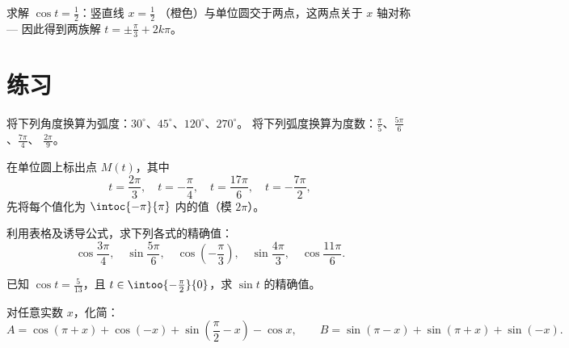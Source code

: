 \begin{omfigure}

{\small 求解 $\cos t = \frac12$：竖直线 $x = \frac12$
（橙色）与单位圆交于两点，这两点关于 $x$ 轴对称
--- 因此得到两族解 $t = \pm\frac\pi3 + 2k\pi$。}
\end{omfigure}

\section{练习}

\begin{exercise}[$\star$]\label{exo:g11:trigo:1}
将下列角度换算为弧度：$30^\circ$、$45^\circ$、$120^\circ$、$270^\circ$。
将下列弧度换算为度数：$\frac{\pi}{5}$、$\frac{5\pi}{6}$、$\frac{7\pi}{4}$、
$\frac{2\pi}{9}$。
\end{exercise}

\begin{exercise}[$\star$]\label{exo:g11:trigo:2}
在单位圆上标出点 $M(t)$，其中
\[
t = \frac{2\pi}{3},\quad
t = -\frac{\pi}{4},\quad
t = \frac{17\pi}{6},\quad
t = -\frac{7\pi}{2},
\]
先将每个值化为 $\intoc{-\pi}{\pi}$ 内的值（模 $2\pi$）。
\end{exercise}

\begin{exercise}[$\star$]\label{exo:g11:trigo:3}
利用表格及诱导公式，求下列各式的精确值：
\[
\cos\frac{3\pi}{4}, \quad
\sin\frac{5\pi}{6}, \quad
\cos\left(-\frac{\pi}{3}\right), \quad
\sin\frac{4\pi}{3}, \quad
\cos\frac{11\pi}{6} .
\]
\end{exercise}

\begin{exercise}[$\star$]\label{exo:g11:trigo:4}
已知 $\cos t = \frac{5}{13}$，且 $t \in \intoo{-\frac\pi2}{0}$，求
$\sin t$ 的精确值。
\end{exercise}

\begin{exercise}[$\star\star$]\label{exo:g11:trigo:5}
对任意实数 $x$，化简：
\[
A = \cos(\pi + x) + \cos(-x) + \sin\left(\frac\pi2 - x\right) - \cos x,
\qquad
B = \sin(\pi - x) + \sin(\pi + x) + \sin(-x) .
\]
\end{exercise}

